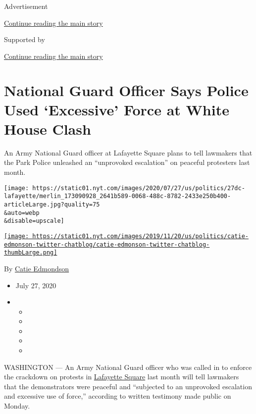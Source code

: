 Advertisement

\protect\hyperlink{after-top}{Continue reading the main story}

Supported by

\protect\hyperlink{after-sponsor}{Continue reading the main story}

\hypertarget{national-guard-officer-says-police-used-excessive-force-at-white-house-clash}{%
\section{National Guard Officer Says Police Used `Excessive' Force at
White House
Clash}\label{national-guard-officer-says-police-used-excessive-force-at-white-house-clash}}

An Army National Guard officer at Lafayette Square plans to tell
lawmakers that the Park Police unleashed an ``unprovoked escalation'' on
peaceful protesters last month.

\texttt{[image: https://static01.nyt.com/images/2020/07/27/us/politics/27dc-lafayette/merlin\_173090928\_2641b589-0068-488c-8782-2433e250b400-articleLarge.jpg?quality=75\\\&auto=webp\\\&disable=upscale]}

\href{https://www.nytimes.com/by/catie-edmondson}{\texttt{[image: https://static01.nyt.com/images/2019/11/20/us/politics/catie-edmonson-twitter-chatblog/catie-edmonson-twitter-chatblog-thumbLarge.png]}}

By \href{https://www.nytimes.com/by/catie-edmondson}{Catie Edmondson}

\begin{itemize}
\item
  July 27, 2020
\item
  \begin{itemize}
  \item
  \item
  \item
  \item
  \item
  \end{itemize}
\end{itemize}

WASHINGTON --- An Army National Guard officer who was called in to
enforce the crackdown on protests in
\href{https://www.nytimes.com/2020/07/28/us/politics/lafayette-square-park-police-protests.html}{Lafayette
Square} last month will tell lawmakers that the demonstrators were
peaceful and ``subjected to an unprovoked escalation and excessive use
of force,'' according to written testimony made public on Monday.

